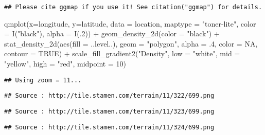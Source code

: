 \documentclass[
]{article}
\newenvironment{Shaded}{\begin{snugshade}}{\end{snugshade}}
\newcommand{\AttributeTok}[1]{\textcolor[rgb]{0.77,0.63,0.00}{#1}}
\newcommand{\ConstantTok}[1]{\textcolor[rgb]{0.00,0.00,0.00}{#1}}
\newcommand{\DecValTok}[1]{\textcolor[rgb]{0.00,0.00,0.81}{#1}}
\newcommand{\FunctionTok}[1]{\textcolor[rgb]{0.00,0.00,0.00}{#1}}
\newcommand{\NormalTok}[1]{#1}
\newcommand{\SpecialCharTok}[1]{\textcolor[rgb]{0.00,0.00,0.00}{#1}}
\newcommand{\StringTok}[1]{\textcolor[rgb]{0.31,0.60,0.02}{#1}}
\begin{document}
\begin{verbatim}
## Please cite ggmap if you use it! See citation("ggmap") for details.
\end{verbatim}

\begin{Shaded}
\begin{Highlighting}[]
\FunctionTok{qmplot}\NormalTok{(}\AttributeTok{x=}\NormalTok{longitude, }\AttributeTok{y=}\NormalTok{latitude,}
       \AttributeTok{data =}\NormalTok{ location,}
       \AttributeTok{maptype =} \StringTok{"toner{-}lite"}\NormalTok{,}
       \AttributeTok{color =} \FunctionTok{I}\NormalTok{(}\StringTok{"black"}\NormalTok{),}
       \AttributeTok{alpha =} \FunctionTok{I}\NormalTok{(.}\DecValTok{2}\NormalTok{)) }\SpecialCharTok{+}
  \FunctionTok{geom\_density\_2d}\NormalTok{(}\AttributeTok{color =} \StringTok{"black"}\NormalTok{) }\SpecialCharTok{+}
  \FunctionTok{stat\_density\_2d}\NormalTok{(}\FunctionTok{aes}\NormalTok{(}\AttributeTok{fill =}\NormalTok{ ..level..),}
                  \AttributeTok{geom =} \StringTok{"polygon"}\NormalTok{,}
                  \AttributeTok{alpha =}\NormalTok{ .}\DecValTok{4}\NormalTok{,}
                  \AttributeTok{color =} \ConstantTok{NA}\NormalTok{,}
                  \AttributeTok{contour =} \ConstantTok{TRUE}\NormalTok{) }\SpecialCharTok{+}
  \FunctionTok{scale\_fill\_gradient2}\NormalTok{(}\StringTok{"Density"}\NormalTok{,}
                       \AttributeTok{low =} \StringTok{"white"}\NormalTok{,}
                       \AttributeTok{mid =} \StringTok{"yellow"}\NormalTok{,}
                       \AttributeTok{high =} \StringTok{"red"}\NormalTok{,}
                       \AttributeTok{midpoint =} \DecValTok{10}\NormalTok{)}
\end{Highlighting}
\end{Shaded}

\begin{verbatim}
## Using zoom = 11...
\end{verbatim}

\begin{verbatim}
## Source : http://tile.stamen.com/terrain/11/322/699.png
\end{verbatim}

\begin{verbatim}
## Source : http://tile.stamen.com/terrain/11/323/699.png
\end{verbatim}

\begin{verbatim}
## Source : http://tile.stamen.com/terrain/11/324/699.png
\end{verbatim}
\end{document}
